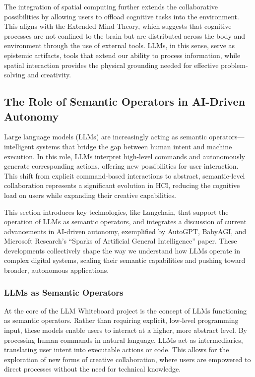 The integration of spatial computing further extends the collaborative possibilities by allowing users to offload cognitive tasks into the environment.
This aligns with the Extended Mind Theory, which suggests that cognitive processes are not confined to the brain but are distributed across the body and environment through the use of external tools.
LLMs, in this sense, serve as epistemic artifacts, tools that extend our ability to process information, while spatial interaction provides the physical grounding needed for effective problem-solving and creativity.


\subsection{The Role of Semantic Operators in AI-Driven Autonomy}
Large language models (LLMs) are increasingly acting as semantic operators—intelligent systems that bridge the gap between human intent and machine execution.
In this role, LLMs interpret high-level commands and autonomously generate corresponding actions, offering new possibilities for user interaction.
This shift from explicit command-based interactions to abstract, semantic-level collaboration represents a significant evolution in HCI, reducing the cognitive load on users while expanding their creative capabilities.

This section introduces key technologies, like Langchain\cite{chase2022}, that support the operation of LLMs as semantic operators, and integrates a discussion of current advancements in AI-driven autonomy, exemplified by AutoGPT\cite{autogpt2024}, BabyAGI\cite{nakajima2024}, and Microsoft Research’s “Sparks of Artificial General Intelligence” paper\cite{bubeck2023sparks}.
These developments collectively shape the way we understand how LLMs operate in complex digital systems, scaling their semantic capabilities and pushing toward broader, autonomous applications.

\subsubsection{LLMs as Semantic Operators}
At the core of the LLM Whiteboard project is the concept of LLMs functioning as semantic operators.
Rather than requiring explicit, low-level programming input, these models enable users to interact at a higher, more abstract level.
By processing human commands in natural language, LLMs act as intermediaries, translating user intent into executable actions or code.
This allows for the exploration of new forms of creative collaboration, where users are empowered to direct processes without the need for technical knowledge.

